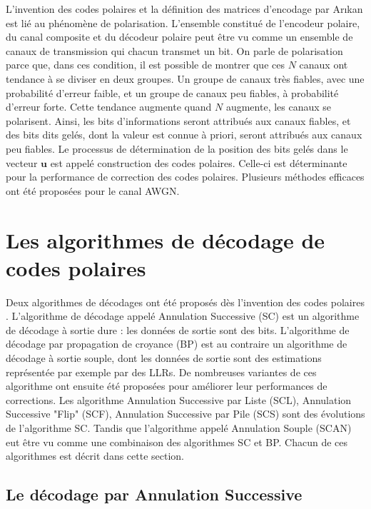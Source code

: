 L'invention des codes polaires et la définition des matrices d'encodage par Ar{\i}kan \cite{arikan_channel_2009} est lié au phénomène de polarisation. L'ensemble constitué de l'encodeur polaire, du canal composite et du décodeur polaire peut être vu comme un ensemble de canaux de transmission qui chacun transmet un bit. On parle de polarisation parce que, dans ces condition, il est possible de montrer que ces $N$ canaux ont tendance à se diviser en deux groupes. Un groupe de canaux très fiables, avec une probabilité d'erreur faible, et un groupe de canaux peu fiables, à probabilité d'erreur forte. Cette tendance augmente quand $N$ augmente, les canaux se polarisent. Ainsi, les bits d'informations seront attribués aux canaux fiables, et des bits dits gelés, dont la valeur est connue à priori, seront attribués aux canaux peu fiables. Le processus de détermination de la position des bits gelés dans le vecteur $\mathbold{u}$ est appelé construction des codes polaires. Celle-ci est déterminante pour la performance de correction des codes polaires. Plusieurs méthodes efficaces ont été proposées \cite{tal_how_2013,trifonov_efficient_2012} pour le canal AWGN.

\section{Les algorithmes de décodage de codes polaires}

Deux algorithmes de décodages ont été proposés dès l'invention des codes polaires \cite{arikan_channel_2009}. L'algorithme de décodage appelé Annulation Successive (SC) est un algorithme de décodage à sortie dure : les données de sortie sont des bits. L'algorithme de décodage par propagation de croyance (BP) est au contraire un algorithme de décodage à sortie souple, dont les données de sortie sont des estimations représentée par exemple par des LLRs. De nombreuses variantes de ces algorithme ont ensuite été proposées pour améliorer leur performances de corrections. Les algorithme Annulation Successive par Liste (SCL), Annulation Successive "Flip" (SCF), Annulation Successive par Pile (SCS) sont des évolutions de l'algorithme SC. Tandis que l'algorithme appelé Annulation Souple (SCAN) eut être vu comme une combinaison des algorithmes SC et BP. Chacun de ces algorithmes est décrit dans cette section.

\subsection{Le décodage par Annulation Successive}

